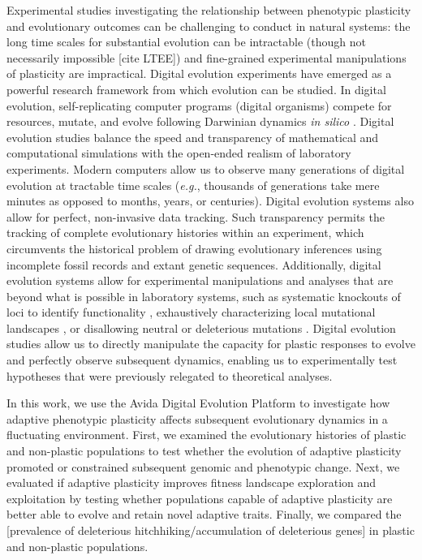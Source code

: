 Experimental studies investigating the relationship between phenotypic plasticity and evolutionary outcomes can be challenging to conduct in natural systems: 
the long time scales for substantial evolution can be intractable (though not necessarily impossible [cite LTEE]) and fine-grained experimental manipulations of plasticity are impractical.
Digital evolution experiments have emerged as a powerful research framework from which evolution can be studied.
In digital evolution, self-replicating computer programs (digital organisms) compete for resources, mutate, and evolve following Darwinian dynamics \textit{in silico}  \citep{mckinley_harnessing_2008}.
Digital evolution studies balance the speed and transparency of mathematical and computational simulations with the open-ended realism of laboratory experiments.
Modern computers allow us to observe many generations of digital evolution at tractable time scales (\textit{e.g.}, thousands of generations take mere minutes as opposed to months, years, or centuries).
Digital evolution systems also allow for perfect, non-invasive data tracking.
Such transparency permits the tracking of complete evolutionary histories within an experiment, which circumvents the historical problem of drawing evolutionary inferences using incomplete fossil records and extant genetic sequences.
Additionally, digital evolution systems allow for experimental manipulations and analyses that are beyond what is possible in laboratory systems, such as 
systematic knockouts of loci to identify functionality \citep{lenski_evolutionary_2003},
exhaustively characterizing local mutational landscapes \citep{lenski_genome_1999,canino-koning_fluctuating_2019},
or disallowing neutral or deleterious mutations \citep{covert_experiments_2013}. 
Digital evolution studies allow us to directly manipulate the capacity for plastic responses to evolve and perfectly observe subsequent dynamics, enabling us to experimentally test hypotheses that were previously relegated to theoretical analyses.

In this work, we use the Avida Digital Evolution Platform \citep{ofria_avida:_2009} to investigate how adaptive phenotypic plasticity affects subsequent evolutionary dynamics in a fluctuating environment.
First, we examined the evolutionary histories of plastic and non-plastic populations to test whether the evolution of adaptive plasticity promoted or constrained subsequent genomic and phenotypic change.
Next, we evaluated if adaptive plasticity improves fitness landscape exploration and exploitation by testing whether populations capable of adaptive plasticity are better able to evolve and retain novel adaptive traits. 
Finally, we compared the [prevalence of deleterious hitchhiking/accumulation of deleterious genes] in plastic and non-plastic populations. 

